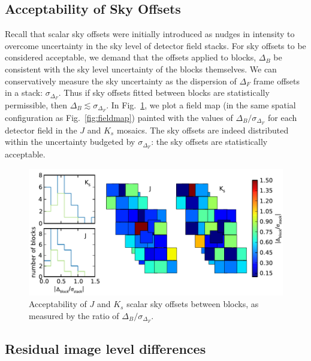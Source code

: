 \documentclass[iop]{emulateapj}
\newcommand{\Fig}[1]{Fig.~\ref{fig:#1}}  %
\begin{document}
\subsection{Acceptability of Sky Offsets}
\label{sec:offset_acceptability}

Recall that scalar sky offsets were initially introduced as nudges in intensity to overcome uncertainty in the sky level of detector field stacks.
For sky offsets to be considered acceptable, we demand that the offsets applied to blocks, $\Delta_B$ be consistent with the sky level uncertainty of the blocks themselves.
We can conservatively measure the sky uncertainty as the dispersion of $\Delta_F$ frame offsets in a stack: $\sigma_{\Delta_F}$.
Thus if sky offsets fitted between blocks are statistically permissible, then $\Delta_B \lesssim \sigma_{\Delta_F}$.
In \Fig{offset_ratio_map}, we plot a field map (in the same spatial configuration as \Fig{fieldmap}) painted with the values of $\Delta_B / \sigma_{\Delta_F}$ for each detector field in the $J$ and $K_s$ mosaics.
The sky offsets are indeed distributed within the uncertainty budgeted by $\sigma_{\Delta_F}$: the sky offsets are statistically acceptable.

\begin{figure}[t]
\centering
\includegraphics[width=\columnwidth]{figs/offset_ratio_map_enhanced}
\caption{Acceptability of $J$ and $K_s$ scalar sky offsets between blocks, as measured by the ratio of $\Delta_B/\sigma_{\Delta_F}$.}
\label{fig:offset_ratio_map}
\end{figure}

\subsection{Residual image level differences}
\label{sec:residual_diffs}
\end{document}

